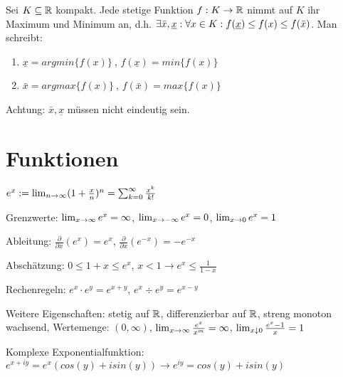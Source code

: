 \begin{satz}
	Sei $K \subseteq \mathbb{R}$ kompakt. Jede stetige Funktion $f : K \rightarrow \mathbb{R}$ nimmt auf $K$ ihr Maximum und Minimum an, d.h. $\exists \bar{x}, \underline{x}: \forall x \in K : f(\underline{x}) \leq f(x) \leq f(\bar{x})$. Man schreibt:
	
	\begin{enumerate}[noitemsep]
		\item $\underline{x} = argmin \{ f(x) \} \medspace$, $f(\underline{x}) = min \{f(x)\}$
		\item $\bar{x} = argmax \{ f(x) \} \medspace$, $f(\bar{x}) = max \{f(x)\}$
	\end{enumerate}

	Achtung: $\bar{x}, \underline{x}$ müssen nicht eindeutig sein.
\end{satz}
	
\section{Funktionen}


\begin{definition}[Exponentialfunktion]
	$e^x := \lim_{n \rightarrow \infty} (1 + \frac{x}{n})^n = \sum_{k=0}^{\infty} \frac{x^k}{k!}$
	\begin{description} [noitemsep]
		\item Grenzwerte: $\lim_{x \rightarrow \infty} e^x = \infty$, $\lim_{x \rightarrow -\infty} e^x = 0$, $\lim_{x \rightarrow 0} e^x = 1$
		\item Ableitung: $\frac{\partial}{\partial x}(e^x) = e^x$, $\frac{\partial}{\partial x}(e^{-x}) = -e^{-x}$		
		\item Abschätzung: $ 0 \leq 1 + x \leq e^x$,  $x < 1 \rightarrow e^x \leq \frac{1}{1 - x}$ 
		\item Rechenregeln: $e^x \cdot e^y = e^{x+y}$, $e^x \div e^y = e^{x-y}$
		\item Weitere Eigenschaften: stetig auf $\mathbb{R}$, differenzierbar auf $\mathbb{R}$, streng monoton wachsend, Wertemenge: $(0, \infty)$, $\lim_{x \rightarrow \infty} \frac{e^x}{x^m} = \infty$, $\lim_{x \downarrow 0} \frac{e^x - 1}{x} = 1$
		\item Komplexe Exponentialfunktion: $e^{x+iy} = e^x(cos(y) + i sin(y)) \rightarrow e^{iy} = cos(y) + i sin(y)$
	\end{description}
\end{definition}

